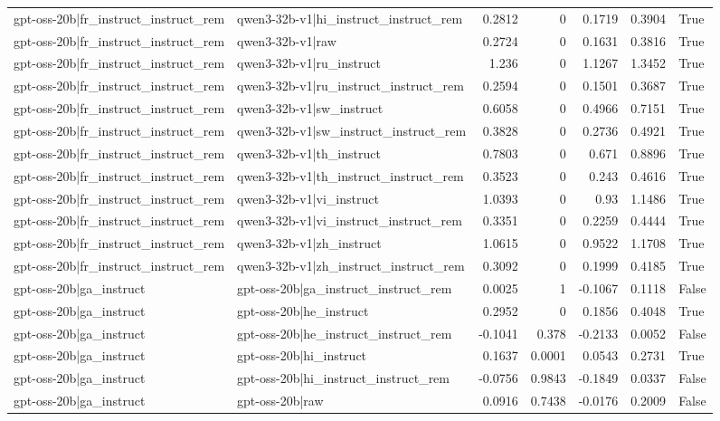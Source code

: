 \begin{table}
\begin{tabular}{l l r r r r l}
gpt-oss-20b|fr_instruct_instruct_rem & qwen3-32b-v1|hi_instruct_instruct_rem & 0.2812 & 0 & 0.1719 & 0.3904 & True \\
gpt-oss-20b|fr_instruct_instruct_rem & qwen3-32b-v1|raw & 0.2724 & 0 & 0.1631 & 0.3816 & True \\
gpt-oss-20b|fr_instruct_instruct_rem & qwen3-32b-v1|ru_instruct & 1.236 & 0 & 1.1267 & 1.3452 & True \\
gpt-oss-20b|fr_instruct_instruct_rem & qwen3-32b-v1|ru_instruct_instruct_rem & 0.2594 & 0 & 0.1501 & 0.3687 & True \\
gpt-oss-20b|fr_instruct_instruct_rem & qwen3-32b-v1|sw_instruct & 0.6058 & 0 & 0.4966 & 0.7151 & True \\
gpt-oss-20b|fr_instruct_instruct_rem & qwen3-32b-v1|sw_instruct_instruct_rem & 0.3828 & 0 & 0.2736 & 0.4921 & True \\
gpt-oss-20b|fr_instruct_instruct_rem & qwen3-32b-v1|th_instruct & 0.7803 & 0 & 0.671 & 0.8896 & True \\
gpt-oss-20b|fr_instruct_instruct_rem & qwen3-32b-v1|th_instruct_instruct_rem & 0.3523 & 0 & 0.243 & 0.4616 & True \\
gpt-oss-20b|fr_instruct_instruct_rem & qwen3-32b-v1|vi_instruct & 1.0393 & 0 & 0.93 & 1.1486 & True \\
gpt-oss-20b|fr_instruct_instruct_rem & qwen3-32b-v1|vi_instruct_instruct_rem & 0.3351 & 0 & 0.2259 & 0.4444 & True \\
gpt-oss-20b|fr_instruct_instruct_rem & qwen3-32b-v1|zh_instruct & 1.0615 & 0 & 0.9522 & 1.1708 & True \\
gpt-oss-20b|fr_instruct_instruct_rem & qwen3-32b-v1|zh_instruct_instruct_rem & 0.3092 & 0 & 0.1999 & 0.4185 & True \\
gpt-oss-20b|ga_instruct & gpt-oss-20b|ga_instruct_instruct_rem & 0.0025 & 1 & -0.1067 & 0.1118 & False \\
gpt-oss-20b|ga_instruct & gpt-oss-20b|he_instruct & 0.2952 & 0 & 0.1856 & 0.4048 & True \\
gpt-oss-20b|ga_instruct & gpt-oss-20b|he_instruct_instruct_rem & -0.1041 & 0.378 & -0.2133 & 0.0052 & False \\
gpt-oss-20b|ga_instruct & gpt-oss-20b|hi_instruct & 0.1637 & 0.0001 & 0.0543 & 0.2731 & True \\
gpt-oss-20b|ga_instruct & gpt-oss-20b|hi_instruct_instruct_rem & -0.0756 & 0.9843 & -0.1849 & 0.0337 & False \\
gpt-oss-20b|ga_instruct & gpt-oss-20b|raw & 0.0916 & 0.7438 & -0.0176 & 0.2009 & False \\

\end{tabular}
\end{table}
